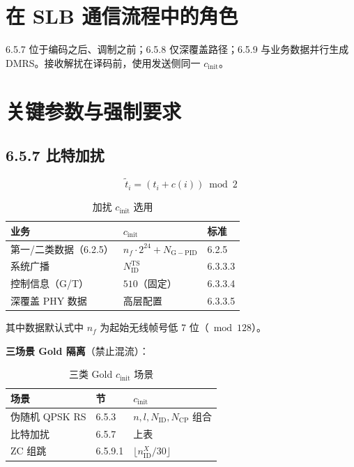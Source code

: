 \documentclass[11pt,a4paper]{ctexart}
\begin{document}
\section{在 SLB 通信流程中的角色}

6.5.7 位于编码之后、调制之前；6.5.8 仅深覆盖路径；6.5.9 与业务数据并行生成 DMRS。接收解扰在译码前，使用发送侧同一 $c_{\mathrm{init}}$。

\section{关键参数与强制要求}

\subsection{6.5.7 比特加扰}

\begin{equation}
\tilde{t}_i=(t_i+c(i))\bmod 2
\end{equation}

\begin{longtable}{L{4.5cm}L{5.5cm}L{4cm}}
\caption{加扰 $c_{\mathrm{init}}$ 选用\label{tab:6579-cinit}} \\
\toprule
\textbf{业务} & \textbf{$c_{\mathrm{init}}$} & \textbf{标准} \\
\midrule
第一/二类数据（6.2.5） & $n_f\cdot 2^{24}+N_{\mathrm{G-PID}}$ & 6.2.5 \\
系统广播 & $N_{\mathrm{ID}}^{\mathrm{TS}}$ & 6.3.3.3 \\
控制信息（G/T） & $510$（固定） & 6.3.3.4 \\
深覆盖 PHY 数据 & 高层配置 & 6.3.3.5 \\
\bottomrule
\end{longtable}

其中数据默认式中 $n_f$ 为起始无线帧号低 7 位（$\bmod 128$）。

\textbf{三场景 Gold 隔离}（禁止混流）：

\begin{longtable}{L{4cm}L{2.2cm}L{7.5cm}}
\caption{三类 Gold $c_{\mathrm{init}}$ 场景\label{tab:6579-gold3}} \\
\toprule
\textbf{场景} & \textbf{节} & \textbf{$c_{\mathrm{init}}$} \\
\midrule
伪随机 QPSK RS & 6.5.3 & $n,l,N_{\mathrm{ID}},N_{\mathrm{CP}}$ 组合 \\
比特加扰 & 6.5.7 & 上表 \\
ZC 组跳 & 6.5.9.1 & $\lfloor n_{\mathrm{ID}}^X/30\rfloor$ \\
\bottomrule
\end{longtable}
\end{document}
